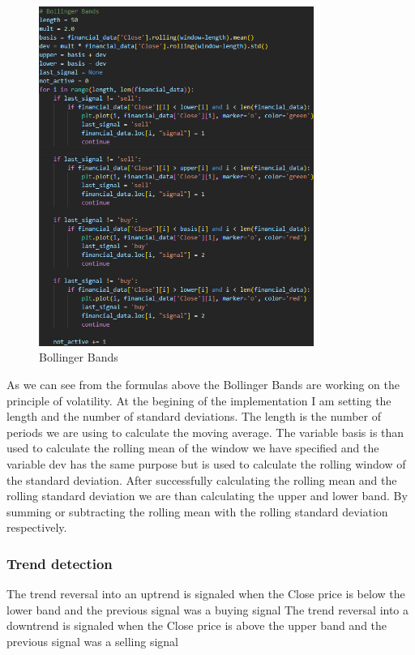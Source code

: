 \documentclass{imc-inf}
\begin{document}
	\begin{figure}[h!]
		\centering
		\includegraphics[width=0.8\textwidth]{bollinger_bands_code.png}
		\caption{Bollinger Bands}
		\label{fig:bollinger_bands}
		
	\end{figure}
	As we can see from the formulas above the Bollinger Bands are working on the principle of volatility.
	At the begining of the implementation I am setting the length and the number of standard deviations. The length is the number of periods we are using to calculate
	the moving average. The variable basis is than used to calculate the rolling mean of the window we have specified and the variable dev 
	has the same purpose but is used to calculate the rolling window of the standard deviation.
	After successfully calculating the rolling mean and the rolling standard deviation we are than calculating the upper and lower band. By
	summing or subtracting the rolling mean with the rolling standard deviation respectively.
	
	\subsubsection{Trend detection}
	The trend reversal into an uptrend is signaled when the Close price is below the lower band and the previous signal was a buying signal
	The trend reversal into a downtrend is signaled when the Close price is above the upper band and the previous signal was a selling signal
	
\end{document}
